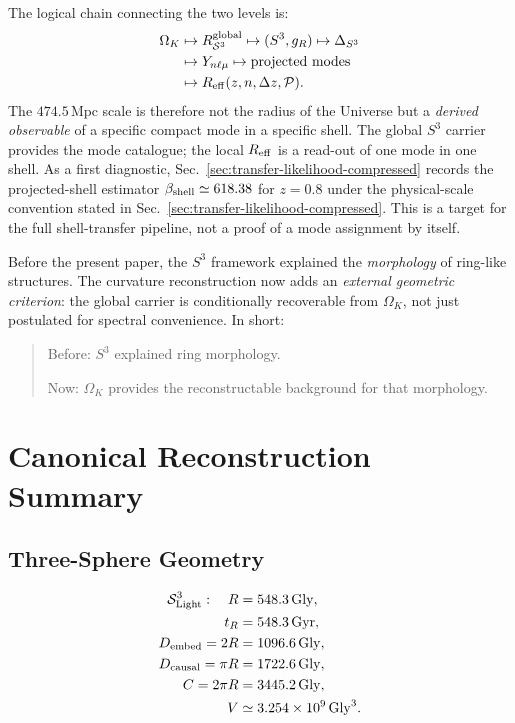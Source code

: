 \documentclass[aps,prd,onecolumn,superscriptaddress,longbibliography,nofootinbib,notitlepage]{revtex4-2}
\newcommand{\Gly}{\,\mathrm{Gly}}
\newcommand{\Gyr}{\,\mathrm{Gyr}}
\begin{document}
The logical chain connecting the two levels is:
\begin{equation}
\begin{split}
  \Omega_K
  &\mapsto R_{\mathcal{S}^3}^{\rm global}
   \mapsto (S^3, g_R)
   \mapsto \Delta_{S^3} \\
  &\mapsto Y_{n\ell\mu}
   \mapsto \text{projected modes} \\
  &\mapsto R_{\rm eff}(z,n,\Delta z,{\cal P}).
\end{split}
\end{equation}
The $474.5\,\mathrm{Mpc}$ scale is therefore not the radius of the Universe
but a \emph{derived observable} of a specific compact mode in a specific shell.
The global $S^3$ carrier provides the mode catalogue; the local $R_{\rm eff}$
is a read-out of one mode in one shell.
As a first diagnostic, Sec.~\ref{sec:transfer-likelihood-compressed} records the
projected-shell estimator $\beta_{\rm shell}\simeq618.38$ for $z=0.8$ under the
physical-scale convention stated in Sec.~\ref{sec:transfer-likelihood-compressed}.
This is a target for the full shell-transfer pipeline, not a proof of a mode assignment by itself.

Before the present paper, the $S^3$ framework explained the \emph{morphology}
of ring-like structures. The curvature reconstruction now adds an
\emph{external geometric criterion}: the global carrier is conditionally
recoverable from $\Omega_K$, not just postulated for spectral convenience. In
short:
\begin{quote}
Before: $S^3$ explained ring morphology.\par
Now: $\Omega_K$ provides the reconstructable background for that morphology.
\end{quote}

\section{Canonical Reconstruction Summary}
\label{sec:canonical}

\subsection{Three-Sphere Geometry}

\begin{align}
  \mathcal{S}^3_{\rm Light}:\quad R &= 548.3\Gly, \\
  t_R &= 548.3\Gyr, \\
  D_{\rm embed}=2R &= 1096.6\Gly, \\
  D_{\rm causal}=\pi R &= 1722.6\Gly, \\
  C=2\pi R &= 3445.2\Gly, \\
  V &\simeq 3.254\times 10^{9}\Gly^3.
\end{align}
\end{document}
